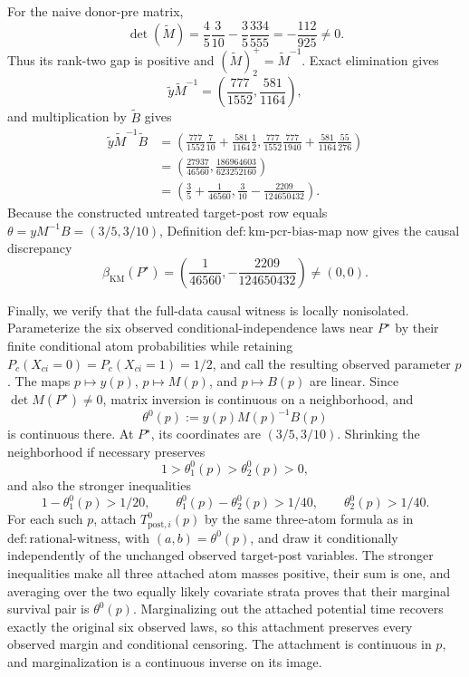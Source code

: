 For the naive donor-pre matrix,
\[
\det(\widetilde M)
=\frac45\frac3{10}-\frac35\frac{334}{555}
=-\frac{112}{925}\ne0.
\]
Thus its rank-two gap is positive and \((\widetilde M)_2^+=\widetilde M^{-1}\). Exact elimination gives
\[
\widetilde y\widetilde M^{-1}
=\left(\frac{777}{1552},\frac{581}{1164}\right),
\]
and multiplication by \(\widetilde B\) gives
\[
\begin{aligned}
\widetilde y\widetilde M^{-1}\widetilde B
&=\left(
\frac{777}{1552}\frac7{10}+\frac{581}{1164}\frac12,
\frac{777}{1552}\frac{777}{1940}
 +\frac{581}{1164}\frac{55}{276}
\right)\\
&=\left(\frac{27937}{46560},
\frac{186964603}{623252160}\right)\\
&=\left(\frac35+\frac1{46560},
\frac3{10}-\frac{2209}{124650432}\right).
\end{aligned}
\]
Because the constructed untreated target-post row equals \(\theta=yM^{-1}B=(3/5,3/10)\), Definition \(\mathrm{def{:}km\mbox{-}pcr\mbox{-}bias\mbox{-}map}\) now gives the causal discrepancy
\[
\beta_{\mathrm{KM}}(P^\star)
=\left(\frac1{46560},-\frac{2209}{124650432}\right)\ne(0,0).
\]

Finally, we verify that the full-data causal witness is locally nonisolated. Parameterize the six observed conditional-independence laws near \(P^\star\) by their finite conditional atom probabilities while retaining \(P_c(X_{ci}=0)=P_c(X_{ci}=1)=1/2\), and call the resulting observed parameter \(p\). The maps \(p\mapsto y(p)\), \(p\mapsto M(p)\), and \(p\mapsto B(p)\) are linear. Since \(\det M(P^\star)\ne0\), matrix inversion is continuous on a neighborhood, and
\[
\theta^0(p):=y(p)M(p)^{-1}B(p)
\]
is continuous there. At \(P^\star\), its coordinates are \((3/5,3/10)\). Shrinking the neighborhood if necessary preserves
\[
1>\theta^0_1(p)>\theta^0_2(p)>0,
\]
and also the stronger inequalities
\[
1-\theta^0_1(p)>1/20,
\qquad
\theta^0_1(p)-\theta^0_2(p)>1/40,
\qquad
\theta^0_2(p)>1/40.
\]
For each such \(p\), attach \(T^{0}_{\mathrm{post},i}(p)\) by the same three-atom formula as in \(\mathrm{def{:}rational\mbox{-}witness}\), with \((a,b)=\theta^0(p)\), and draw it conditionally independently of the unchanged observed target-post variables. The stronger inequalities make all three attached atom masses positive, their sum is one, and averaging over the two equally likely covariate strata proves that their marginal survival pair is \(\theta^0(p)\). Marginalizing out the attached potential time recovers exactly the original six observed laws, so this attachment preserves every observed margin and conditional censoring. The attachment is continuous in \(p\), and marginalization is a continuous inverse on its image.

